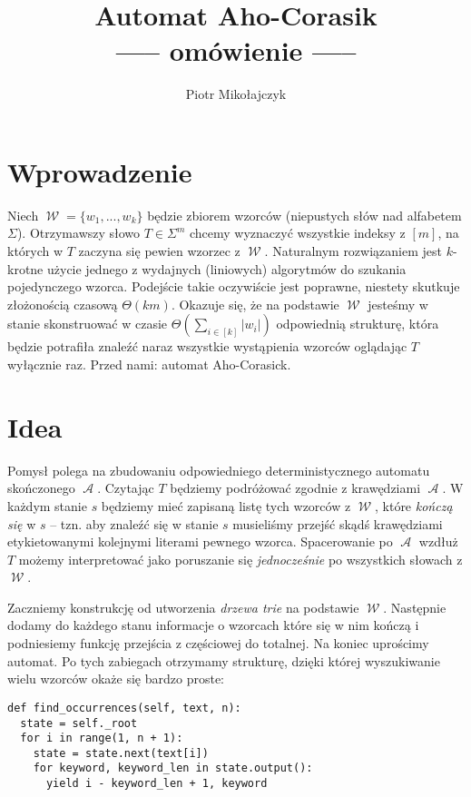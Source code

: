 \documentclass{article}
\title{Automat Aho-Corasik\\\large{----- omówienie -----}}
\author{Piotr Mikołajczyk}
\date{}
\DeclareMathOperator{\W}{\mathcal{W}}
\DeclareMathOperator{\A}{\mathcal{A}}
\begin{document}
\maketitle

% 
% 
% 
% 
% 

\section{Wprowadzenie}

Niech $\W=\{w_1,...,w_k\}$ będzie zbiorem wzorców (niepustych słów nad alfabetem $\Sigma$). Otrzymawszy słowo $T\in\Sigma^m$ chcemy wyznaczyć wszystkie indeksy z $[m]$, na których w $T$ zaczyna się pewien wzorzec z $\W$. Naturalnym rozwiązaniem jest $k$-krotne użycie jednego z wydajnych (liniowych) algorytmów do szukania pojedynczego wzorca. Podejście takie oczywiście jest poprawne, niestety skutkuje złożonością czasową $\Theta(km)$. Okazuje się, że na podstawie $\W$ jesteśmy w stanie skonstruować w czasie $\Theta(\sum_{i\in[k]}|w_i|)$ odpowiednią strukturę, która będzie potrafiła znaleźć naraz wszystkie wystąpienia wzorców oglądając $T$ wyłącznie raz. Przed nami: automat Aho-Corasick.

\section{Idea}

Pomysł polega na zbudowaniu odpowiedniego deterministycznego automatu skończonego $\A$. Czytając $T$ będziemy podróżować zgodnie z krawędziami $\A$. W każdym stanie $s$ będziemy mieć zapisaną listę tych wzorców z $\W$, które \textit{kończą się} w $s$ -- tzn. aby znaleźć się w stanie $s$ musieliśmy przejść skądś krawędziami etykietowanymi kolejnymi literami pewnego wzorca. Spacerowanie po $\A$ wzdłuż $T$ możemy interpretować jako poruszanie się \textit{jednocześnie} po wszystkich słowach z $\W$.

Zaczniemy konstrukcję od utworzenia \textit{drzewa trie} na podstawie $\W$. Następnie dodamy do każdego stanu informacje o wzorcach które się w nim kończą i podniesiemy funkcję przejścia z częściowej do totalnej. Na koniec uprościmy automat. Po tych zabiegach otrzymamy strukturę, dzięki której wyszukiwanie wielu wzorców okaże się bardzo proste:

\begin{verbatim}
def find_occurrences(self, text, n):
  state = self._root
  for i in range(1, n + 1):
    state = state.next(text[i])
    for keyword, keyword_len in state.output():
      yield i - keyword_len + 1, keyword
\end{verbatim}
\end{document}
